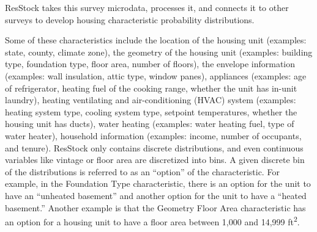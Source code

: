 ResStock takes this survey microdata, processes it, and connects it to other surveys to develop housing characteristic probability distributions. 

 

Some of these characteristics include the location of the housing unit (examples: state, county, climate zone), the geometry of the housing unit (examples: building type, foundation type, floor area, number of floors), the envelope information (examples: wall insulation, attic type, window panes), appliances (examples: age of refrigerator, heating fuel of the cooking range, whether the unit has in-unit laundry), heating ventilating and air-conditioning (HVAC) system (examples: heating system type, cooling system type, setpoint temperatures, whether the housing unit has ducts), water heating (examples: water heating fuel, type of water heater), household information (examples: income, number of occupants, and tenure). ResStock only contains discrete distributions, and even continuous variables like vintage or floor area are discretized into bins. A given discrete bin of the distributions is referred to as an ``option'' of the characteristic. For example, in the Foundation Type characteristic, there is an option for the unit to have an ``unheated basement'' and another option for the unit to have a ``heated basement.'' Another example is that the Geometry Floor Area characteristic has an option for a housing unit to have a floor area between 1,000 and 14,999 ft\textsuperscript{2}.

